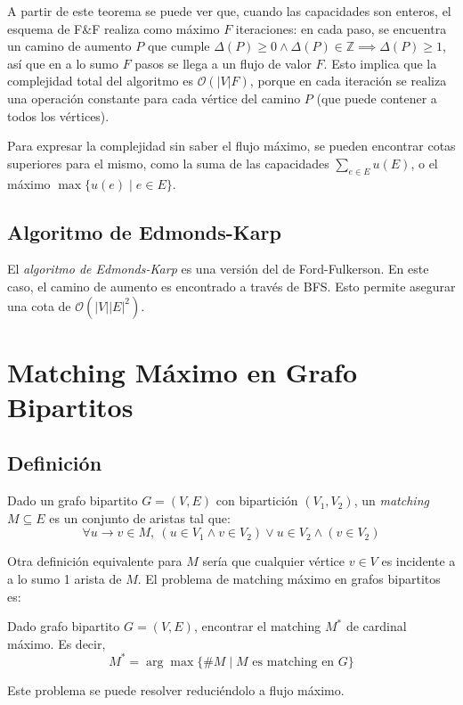 \documentclass[a4paper]{report}
\newcommand{\BigO}[1]{\ensuremath{\mathcal{O}(#1)}}
\newcommand{\Z}{\mathbb{Z}}
\begin{document}
A partir de este teorema se puede ver que, cuando las capacidades son enteros, el esquema de F\&F realiza como máximo $F$ iteraciones: en cada paso, se encuentra un camino de aumento $P$ que cumple $\Delta(P) \geq 0 \land \Delta(P) \in \Z \implies \Delta(P) \geq 1$, así que en a lo sumo $F$ pasos se llega a un flujo de valor $F$. Esto implica que la complejidad total del algoritmo es \BigO{|V|F}, porque en cada iteración se realiza una operación constante para cada vértice del camino $P$ (que puede contener a todos los vértices).

Para expresar la complejidad sin saber el flujo máximo, se pueden encontrar cotas superiores para el mismo, como la suma de las capacidades $\sum_{e \in E} u(E)$, o el máximo $\max{\{u(e) \mid e \in E\}}$.

\subsection{Algoritmo de Edmonds-Karp}
\label{edmonds-karp}

El \textit{algoritmo de Edmonds-Karp} es una versión del de Ford-Fulkerson. En este caso, el camino de aumento es encontrado a través de BFS. Esto permite asegurar una cota de \BigO{|V||E|^2}.

\section{Matching Máximo en Grafo Bipartitos}

\subsection{Definición}

Dado un grafo bipartito $G = (V, E)$ con bipartición $(V_1, V_2)$, un \textit{matching} $M \subseteq E$ es un conjunto de aristas tal que:
$$\forall u \rightarrow v \in M,\ (u \in V_1 \land v \in V_2) \lor u \in V_2 \land (v \in V_2)$$

Otra definición equivalente para $M$ sería que cualquier vértice $v \in V$ es incidente a a lo sumo 1 arista de $M$. El problema de matching máximo en grafos bipartitos es:

\begin{problema}
    Dado grafo bipartito $G = (V, E)$, encontrar el matching $M^*$ de cardinal máximo. Es decir,
    $$M^* = \arg\max{\{\#M \mid M \text{ es matching en } G\}}$$
\end{problema}

Este problema se puede resolver reduciéndolo a flujo máximo.
\end{document}
